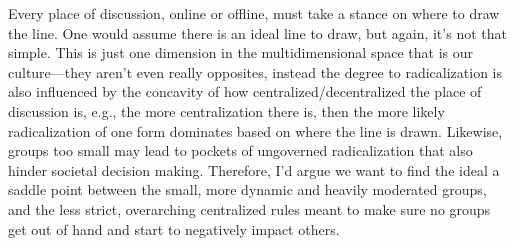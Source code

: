 \documentclass[12pt,a4paper]{article}
\begin{document}
Every place of discussion, online or offline, must take a stance on where to draw the line. One would assume there is an ideal line to draw, but again, it's not that simple. This is just one dimension in the multidimensional space that is our culture---they aren't even really opposites, instead the degree to radicalization is also influenced by the concavity of how centralized/decentralized the place of discussion is, e.g., the more centralization there is, then the more likely radicalization of one form dominates based on where the line is drawn. Likewise, groups too small may lead to pockets of ungoverned radicalization that also hinder societal decision making. Therefore, I'd argue we want to find the ideal a saddle point between the small, more dynamic and heavily moderated groups, and the less strict, overarching centralized rules meant to make sure no groups get out of hand and start to negatively impact others.  
\end{document}
